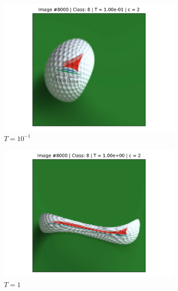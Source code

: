 \begin{figure}[!h]
\begin{subfigure}{0.18\textwidth}
    \includegraphics[width=\textwidth]{ch1-diffy/figures/warping_examples/8000_1_0.png}
    \caption{$T=10^{-1}$}
    \end{subfigure}
    \begin{subfigure}{0.18\textwidth}
    \includegraphics[width=\textwidth]{ch1-diffy/figures/warping_examples/8000_0_0.png}
    \caption{$T=1$}
    \end{subfigure}
    \begin{subfigure}{0.18\textwidth}

\end{subfigure}
\end{figure}

